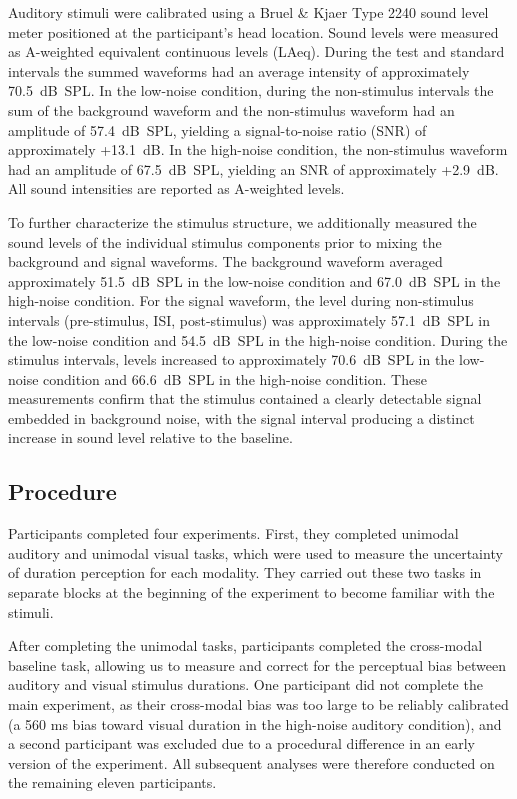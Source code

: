\documentclass{biorxiv}
\begin{document}
Auditory stimuli were calibrated using a Bruel \& Kjaer Type 2240 sound level meter positioned at the participant's head location. Sound levels were measured as A-weighted equivalent continuous levels (LAeq). During the test and standard intervals the summed waveforms had an average intensity of approximately 70.5~dB~SPL. In the low-noise condition, during the non-stimulus intervals the sum of the background waveform and the non-stimulus waveform had an amplitude of 57.4~dB~SPL, yielding a signal-to-noise ratio (SNR) of approximately +13.1~dB. In the high-noise condition, the non-stimulus waveform had an amplitude of 67.5~dB~SPL, yielding an SNR of approximately +2.9~dB. All sound intensities are reported as A-weighted levels.

To further characterize the stimulus structure, we additionally measured the sound levels of the individual stimulus components prior to mixing the background and signal waveforms. The background waveform averaged approximately 51.5~dB~SPL in the low-noise condition and 67.0~dB~SPL in the high-noise condition. For the signal waveform, the level during non-stimulus intervals (pre-stimulus, ISI, post-stimulus) was approximately 57.1~dB~SPL in the low-noise condition and 54.5~dB~SPL in the high-noise condition. During the stimulus intervals, levels increased to approximately 70.6~dB~SPL in the low-noise condition and 66.6~dB~SPL in the high-noise condition. These measurements confirm that the stimulus contained a clearly detectable signal embedded in background noise, with the signal interval producing a distinct increase in sound level relative to the baseline.

\subsection{Procedure}
Participants completed four experiments. First, they completed unimodal auditory and unimodal visual tasks, which were used to measure the uncertainty of duration perception for each modality. They carried out these two tasks in separate blocks at the beginning of the experiment to become familiar with the stimuli. 

After completing the unimodal tasks, participants completed the cross-modal baseline task, allowing us to measure and correct for the perceptual bias between auditory and visual stimulus durations. One participant did not complete the main experiment, as their cross-modal bias was too large to be reliably calibrated (a 560 ms bias toward visual duration in the high-noise auditory condition), and a second participant was excluded due to a procedural difference in an early version of the experiment. All subsequent analyses were therefore conducted on the remaining eleven participants.
\end{document}
